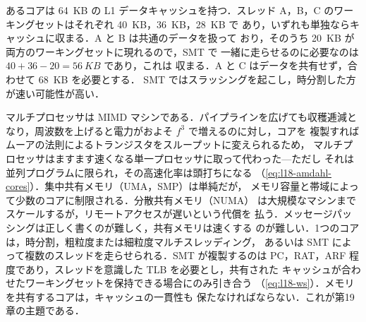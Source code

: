 \documentclass[../main.tex]{subfiles}
\begin{document}
\begin{example}
  あるコアは \SI{64}{KB} の L1 データキャッシュを持つ．スレッド A，B，C
  のワーキングセットはそれぞれ \SI{40}{KB}，\SI{36}{KB}，\SI{28}{KB} で
  あり，いずれも単独ならキャッシュに収まる．A と B は共通のデータを扱って
  おり，そのうち \SI{20}{KB} が両方のワーキングセットに現れるので，SMT で
  一緒に走らせるのに必要なのは $40+36-20=\SI{56}{KB}$ であり，これは
  収まる．A と C はデータを共有せず，合わせて \SI{68}{KB} を必要とする．
  SMT ではスラッシングを起こし，時分割した方が速い可能性が高い．
\end{example}

\begin{keypoint}[章のまとめ]
  マルチプロセッサは MIMD マシンである．パイプラインを広げても収穫逓減と
  なり，周波数を上げると電力がおよそ $f^{3}$ で増えるのに対し，コアを
  複製すればムーアの法則によるトランジスタをスループットに変えられるため，
  マルチプロセッサはますます速くなる単一プロセッサに取って代わった---ただし
  それは並列プログラムに限られ，その高速化率は頭打ちになる
  （\cref{eq:l18-amdahl-cores}）．集中共有メモリ（UMA，SMP）は単純だが，
  メモリ容量と帯域によって少数のコアに制限される．分散共有メモリ（NUMA）
  は大規模なマシンまでスケールするが，リモートアクセスが遅いという代償を
  払う．メッセージパッシングは正しく書くのが難しく，共有メモリは速くする
  のが難しい．1つのコアは，時分割，粗粒度または細粒度マルチスレッディング，
  あるいは SMT によって複数のスレッドを走らせられる．SMT が複製するのは
  PC，RAT，ARF 程度であり，スレッドを意識した TLB を必要とし，共有された
  キャッシュが合わせたワーキングセットを保持できる場合にのみ引き合う
  （\cref{eq:l18-ws}）．メモリを共有するコアは，キャッシュの一貫性も
  保たなければならない．これが第19章の主題である．
\end{keypoint}
\end{document}
